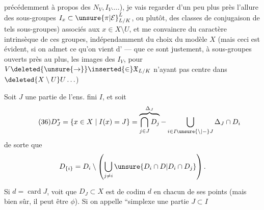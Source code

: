 
précédemment à propos des $N_V,I_V\ldots.$), je vais regarder d'un peu plus près l'allure des sous-groupes $I_x\subset{\unsure{\pi|\mathcal E}}_{L/K}^{\bar L}$, ou  plutôt, des classes de \inserted{$\pi$-}conjugaison de tels sous-groupes) associés aux $x\in X\setminus U$,  et me convaincre du caractère intrinsèque de ces groupes, indépendamment du choix du modèle $X$ (mais ceci est évident, si on admet ce qu'on vient d' --- que ce sont justement, à sous-groupes ouverts près  au plus, les images des $I_V$, pour $V\deleted{\unsure{\to}}\inserted{\in}\mathfrak X_{L/K}$ n'ayant pas  centre dans $\deleted{X\setminus U}U\ldots$)


Soit $J$ une partie de l'ens. fini $I$, et soit
\[
\tag{36}
D_J^*=\{x\in X\mid I(x)=J\}
=\overbrace{\bigcap_{j\in J}D_j}^{\Delta_J}-\bigcup_{i\in I\unsure{\setminus|-}J}\Delta_J\cap D_i
\]
de sorte que
\[
D_{\{i\}}=D_i\setminus\left(\bigcup_{j\ne i}\unsure{D_i\cap D|D_i\cap D_j}\right).
\]
Si $d=\operatorname{card}J$,  voit que $D_J\subset X$ est  de codim\textsuperscript{} $d$ en chacun de ses points (mais bien sûr, il peut être $\phi$). Si on appelle ``simplexe une partie $J\subset I$


